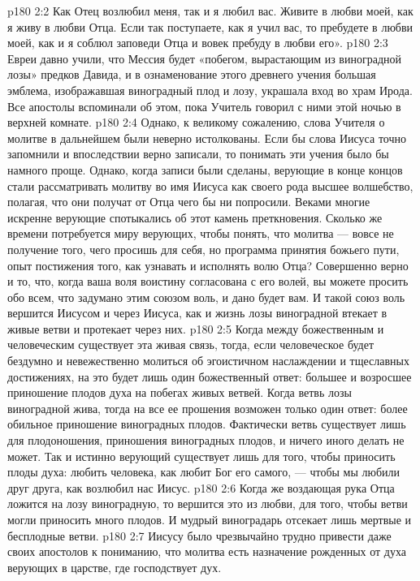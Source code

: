 \vs p180 2:2 Как Отец возлюбил меня, так и я любил вас. Живите в любви моей, как я живу в любви Отца. Если так поступаете, как я учил вас, то пребудете в любви моей, как и я соблюл заповеди Отца и вовек пребуду в любви его».
\vs p180 2:3 Евреи давно учили, что Мессия будет «побегом, вырастающим из виноградной лозы» предков Давида, и в ознаменование этого древнего учения большая эмблема, изображавшая виноградный плод и лозу, украшала вход во храм Ирода. Все апостолы вспоминали об этом, пока Учитель говорил с ними этой ночью в верхней комнате.
\vs p180 2:4 Однако, к великому сожалению, слова Учителя о молитве в дальнейшем были неверно истолкованы. Если бы слова Иисуса точно запомнили и впоследствии верно записали, то понимать эти учения было бы намного проще. Однако, когда записи были сделаны, верующие в конце концов стали рассматривать молитву во имя Иисуса как своего рода высшее волшебство, полагая, что они получат от Отца чего бы ни попросили. Веками многие искренне верующие спотыкались об этот камень преткновения. Сколько же времени потребуется миру верующих, чтобы понять, что молитва --- вовсе не получение того, чего просишь для себя, но программа принятия божьего пути, опыт постижения того, как узнавать и исполнять волю Отца? Совершенно верно и то, что, когда ваша воля воистину согласована с его волей, вы можете просить обо всем, что задумано этим союзом воль, и дано будет вам. И такой союз воль вершится Иисусом и через Иисуса, как и жизнь лозы виноградной втекает в живые ветви и протекает через них.
\vs p180 2:5 Когда между божественным и человеческим существует эта живая связь, тогда, если человеческое будет бездумно и невежественно молиться об эгоистичном наслаждении и тщеславных достижениях, на это будет лишь один божественный ответ: большее и возросшее приношение плодов духа на побегах живых ветвей. Когда ветвь лозы виноградной жива, тогда на все ее прошения возможен только один ответ: более обильное приношение виноградных плодов. Фактически ветвь существует лишь для плодоношения, приношения виноградных плодов, и ничего иного делать не может. Так и истинно верующий существует лишь для того, чтобы приносить плоды духа: любить человека, как любит Бог его самого, --- чтобы мы любили друг друга, как возлюбил нас Иисус.
\vs p180 2:6 Когда же воздающая рука Отца ложится на лозу виноградную, то вершится это из любви, для того, чтобы ветви могли приносить много плодов. И мудрый виноградарь отсекает лишь мертвые и бесплодные ветви.
\vs p180 2:7 Иисусу было чрезвычайно трудно привести даже своих апостолов к пониманию, что молитва есть назначение рожденных от духа верующих в царстве, где господствует дух.
